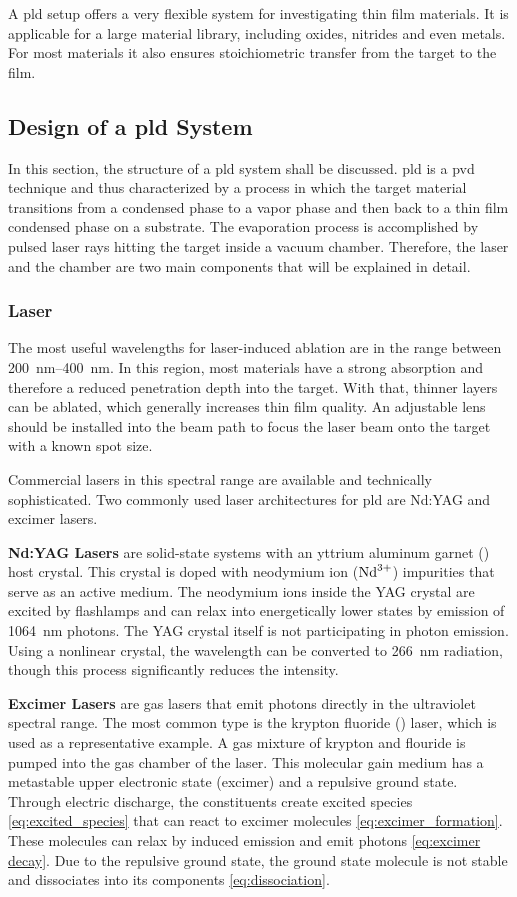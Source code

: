  A \ac{pld} setup offers a very flexible system for investigating thin film materials.
It is applicable for a large material library, including oxides, nitrides and even
metals. 
For most materials it also ensures stoichiometric transfer from the target to the film.

\subsection{Design of a \ac{pld} System}
In this section, the structure of a \ac{pld} system shall be discussed.
\ac{pld} is a \ac{pvd} technique and thus characterized by a process in which the target
material transitions from a condensed phase to a vapor phase and then back to a thin 
film condensed phase on a substrate.
The evaporation process is accomplished by pulsed laser rays hitting the target inside
a vacuum chamber. 
Therefore, the laser and the chamber are  two main components that will be
explained in detail.

\subsubsection{Laser}
The most useful wavelengths for laser-induced ablation are in the range between
\qtyrange{200}{400}{\nano \meter}. 
In this region, most materials have a strong absorption and therefore a reduced 
penetration depth into the target. 
With that, thinner layers can be ablated, which generally increases thin film quality.
An adjustable lens should be installed into the beam path to focus the laser beam onto 
the target with a known spot size.

Commercial lasers in this spectral range are available and technically sophisticated.
Two commonly used laser architectures for \ac{pld} are Nd:YAG and excimer lasers.

\textbf{Nd:YAG Lasers}
are solid-state systems with an yttrium aluminum garnet () host
crystal.
This crystal is doped with neodymium ion ($\ce{Nd^{{3+}}}$) impurities that serve as an
active medium.
The neodymium ions inside the YAG crystal are excited by flashlamps and can 
relax into energetically lower states by emission of \qty{1064}{\nano\meter} photons. 
The YAG crystal itself is not participating in photon emission.
Using a nonlinear crystal, the wavelength can be converted to \qty{266}{\nano\meter} 
radiation, though this process significantly reduces the intensity.

\textbf{Excimer Lasers} are gas lasers that emit photons directly in the ultraviolet 
spectral range.
The most common type is the krypton fluoride () laser, which is used as 
a representative example. 
A gas mixture of krypton and flouride is pumped into the gas chamber of the laser.
This molecular gain medium has a metastable upper electronic state (excimer) 
and a repulsive ground state.
Through electric discharge, the constituents create excited species 
\cref{eq:excited_species} that can react to excimer molecules \cref{eq:excimer_formation}.
These molecules can relax by induced emission and emit photons \cref{eq:excimer decay}.
Due to the repulsive ground state, the ground state molecule is not stable and
dissociates into its components \cref{eq:dissociation}.

